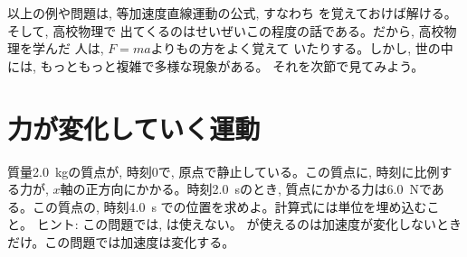 以上の例や問題は, 等加速度直線運動の公式, すなわち
を覚えておけば解ける。そして, 高校物理で
出てくるのはせいぜいこの程度の話である。だから, 高校物理を学んだ
人は, $F=ma$よりもの方をよく覚えて
いたりする。しかし, 世の中には, もっともっと複雑で多様な現象がある。
それを次節で見てみよう。\\


\section{力が変化していく運動}


\begin{q}\label{q:increase_force} 質量2.0~kgの質点が, 
時刻0で, 原点で静止している。この質点に, 時刻に比例する力が, 
$x$軸の正方向にかかる。時刻2.0~sのとき, 質点にかかる力は6.0~Nである。この質点の, 時刻4.0~s
での位置を求めよ。計算式には単位を埋め込むこと。
ヒント: この問題では, は使えない。
が使えるのは加速度が変化しないとき
だけ。この問題では加速度は変化する。\end{q}
\mv











